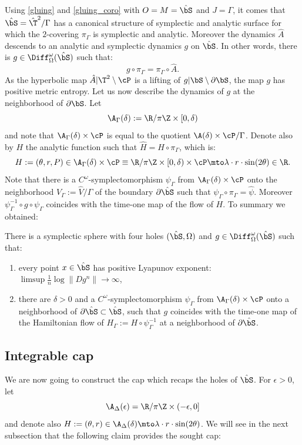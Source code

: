 Using \cref{gluing} and \cref{gluing_coro} with $O=M=\hat \bS$ and $J=\Gamma$, it comes that $\hat \bS = \hat \T^2/\Gamma$ has a canonical structure of symplectic and analytic surface for which
the $2$-covering $\pi_\Gamma $ is symplectic and analytic. Moreover the dynamics $\hat A$ descends to an analytic and symplectic dynamics $g $ on $\hat \bS $. In other words, there is $g \in \Diff^\omega_\Omega (\hat \bS)$ such that:
\[g \circ \pi_\Gamma = \pi_\Gamma \circ \hat A.\]
As the hyperbolic map $\hat A|\T^2\setminus \cP$ is a lifting of $g | \bS \setminus \partial \bS $, the map $g$ has positive metric entropy.
Let us now describe the dynamics of $g$ at the neighborhood of $\partial \bS$.
Let \[\A_\Gamma (\delta):= \R/\pi \Z \times [0, \delta)\]
and note that $ \A_\Gamma (\delta)\times \cP$ is equal to the quotient $\A(\delta)\times \cP/\Gamma$. Denote also by $H $ the analytic function such that $\widehat H=H\circ \pi_\Gamma$, which is:
\begin{equation} \label{HS}
H:= (\theta,r,P)\in \A_\Gamma (\delta)\times \cP \equiv \R/\pi \Z \times [0, \delta)\times \cP\mto \lambda\cdot r \cdot \sin(2\theta)\in \R.\end{equation}
Note that there is a $C^\omega$-symplectomorphism
$\psi_\Gamma$ from $\A_\Gamma (\delta)\times \cP $ onto the neighborhood $V_\Gamma:=\hat V/\Gamma$ of the boundary $\partial \hat \bS $ such that $\psi_\Gamma\circ \pi_\Gamma= \hat \psi$. Moreover $ \psi_\Gamma^{-1} \circ g \circ \psi_\Gamma$
coincides with the time-one map of the flow of $H $. To summary we obtained:

\begin{claim}\label{fonda1} There is a symplectic sphere with four holes $(\hat \bS, \Omega)$ and $g\in \Diff^\omega_\Omega(\hat \bS)$ such that:
\begin{enumerate}
\item\label{fonda11} every point $x\in\hat \bS$ has positive Lyapunov exponent: $\limsup \frac1n \log \|Dg^n\| \to \infty$,
\item\label{fonda12} there are $\delta>0$ and a $C^\omega$-symplectomorphism
$ \psi_\Gamma$ from $\A_\Gamma (\delta)\times \cP$ onto a
neighborhood of $\partial \hat \bS\subset \hat \bS$, such that $g$ coincides with the time-one map of the Hamiltonian flow of $H_\Gamma:= H\circ \psi_\Gamma^{-1}$ at a neighborhood of $\partial \hat \bS$.
\end{enumerate}
\end{claim}

\subsection{Integrable cap}\label{S33}
We are now going to construct the cap which recaps the holes of $\hat \bS$. For $\epsilon>0$, let
\[\A_\Delta (\epsilon)= \R/\pi \Z \times (-\epsilon, 0]\]
and denote also $H:= (\theta,r)\in \A_\Delta(\delta) \mto \lambda\cdot r\cdot \sin(2\theta)$. We will see in the next subsection that the following claim provides the sought cap:

